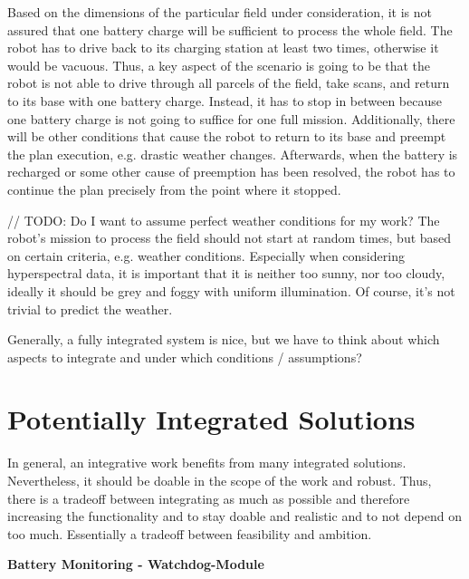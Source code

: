 \documentclass[german, master, expose, latin1]{base/thesis_KBS}
\begin{document}
Based on the dimensions of the particular field under consideration, it is not assured that one battery charge will be sufficient to process the whole field.
The robot has to drive back to its charging station at least two times, otherwise it would be vacuous. Thus, a key aspect of the scenario is going to be that the robot
is not able to drive through all parcels of the field, take scans, and return to its base with one battery charge.
Instead, it has to stop in between because one battery charge is not going to suffice for one full mission. Additionally, there will be other conditions that cause
the robot to return to its base and preempt the plan execution, e.g. drastic weather changes. Afterwards, when the battery is recharged or some other cause of preemption
has been resolved, the robot has to continue the plan precisely from the point where it stopped.\newline

// TODO: Do I want to assume perfect weather conditions for my work?\newline
The robot's mission to process the field should not start at random times, but based on certain criteria, e.g. weather conditions.
Especially when considering hyperspectral data, it is important that it is neither too sunny, nor too cloudy, ideally it should be grey and
foggy with uniform illumination. Of course, it's not trivial to predict the weather.

Generally, a fully integrated system is nice, but we have to think about which aspects to integrate and under which conditions / assumptions?

\section{Potentially Integrated Solutions}

In general, an integrative work benefits from many integrated solutions. Nevertheless, it should be doable in the scope of the work and robust.
Thus, there is a tradeoff between integrating as much as possible and therefore increasing the functionality and to stay doable and realistic and to not depend on too much.
Essentially a tradeoff between feasibility and ambition.\newline

\textbf{Battery Monitoring - Watchdog-Module}\newline
\end{document}
